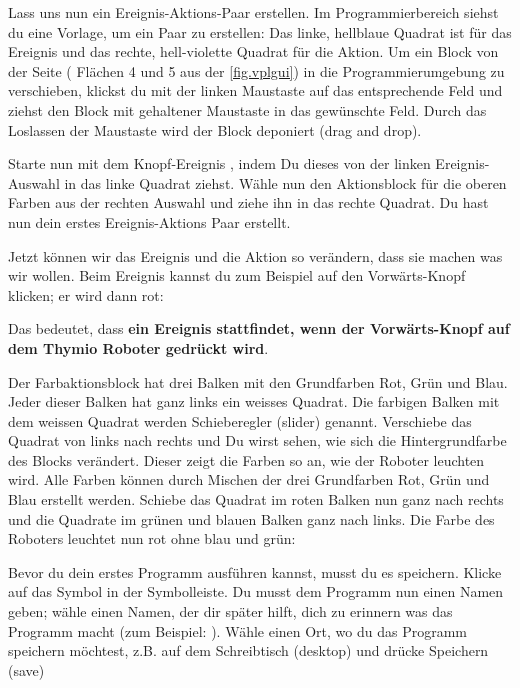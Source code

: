 
Lass uns nun ein Ereignis-Aktions-Paar erstellen. Im Programmierbereich siehst
du eine Vorlage, um ein Paar zu erstellen:  Das
linke, hellblaue Quadrat ist für das Ereignis und das rechte, hell-violette
Quadrat für die Aktion. Um ein Block von der Seite ( Flächen 4 und 5 aus der \cref{fig.vplgui}) in die Programmierumgebung zu verschieben, klickst du mit der linken Maustaste auf das entsprechende Feld und ziehst den Block mit gehaltener Maustaste in das gewünschte Feld. Durch das Loslassen der Maustaste wird der Block deponiert (drag and drop).

Starte nun mit dem Knopf-Ereignis , indem Du dieses
von der linken Ereignis-Auswahl in das linke Quadrat ziehst. Wähle nun den
Aktionsblock für die oberen Farben  aus der rechten
Auswahl und ziehe ihn in das rechte Quadrat. Du hast nun dein erstes
Ereignis-Aktions Paar erstellt.

Jetzt können wir das Ereignis und die Aktion so verändern, dass sie machen was
wir wollen. Beim Ereignis kannst du zum Beispiel auf den Vorwärts-Knopf
klicken; er wird dann rot: 

Das bedeutet, dass \textbf{ein Ereignis stattfindet, wenn der Vorwärts-Knopf auf dem Thymio Roboter
gedrückt wird}.

Der Farbaktionsblock hat drei Balken mit den Grundfarben Rot, Grün und Blau.
Jeder dieser Balken hat ganz links ein weisses Quadrat. Die farbigen Balken mit dem weissen Quadrat werden Schieberegler (slider) genannt. Verschiebe das Quadrat von links nach rechts und Du wirst sehen, wie sich die Hintergrundfarbe des Blocks verändert. Dieser zeigt die Farben so an, wie der Roboter leuchten wird. Alle Farben können durch Mischen der drei Grundfarben Rot, Grün und Blau erstellt werden.
Schiebe das Quadrat im roten Balken nun ganz nach rechts und die Quadrate im grünen und blauen Balken ganz nach links. Die Farbe des Roboters
leuchtet nun rot ohne blau und grün: 


Bevor du dein erstes Programm ausführen kannst, musst du es speichern. Klicke
auf das Symbol  in der Symbolleiste. Du musst dem Programm nun
einen Namen geben; wähle einen Namen, der dir später hilft, dich zu erinnern
was das Programm macht (zum Beispiel: ). Wähle einen Ort, wo du das Programm speichern möchtest, z.B. auf dem Schreibtisch (desktop) und drücke Speichern (save)

